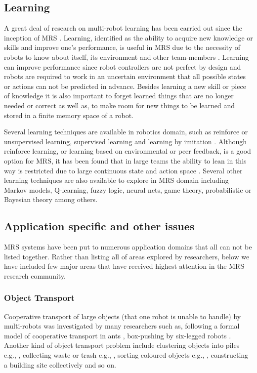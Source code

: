 \subsection{Learning}
A great deal of research on multi-robot learning has been carried out since the inception of MRS \cite{Mataric+2001,Yang+2004,Parker1995}. Learning, identified as the ability to acquire new knowledge or skills and improve one's performance, is useful in MRS due to the necessity of robots to know about itself, its environment and other team-members \cite{Mataric2007}. Learning can improve performance since robot controllers are not perfect by design and robots are required to work in an uncertain environment that all possible states or actions can not be predicted in advance. Besides learning a new skill or piece of knowledge it is also important to forget learned things that are no longer needed or correct as well as, to make room for new things to be learned and stored in a finite memory space of a robot. 

Several learning techniques are available in robotics domain, such as reinforce or unsupervised learning, supervised learning and learning by imitation \cite{Mataric2007}. Although reinforce learning, or learning based on environmental or peer feedback,  is a good option for MRS,  it has been found that  in large teams the ability to lean in this way is restricted due to large continuous state and action space \cite{Yang+2004}. Several other learning techniques are also available to explore in MRS domain including Markov models, Q-learning, fuzzy logic, neural nets, game theory, probabilistic or Bayesian theory among others. 

\subsection{Application specific and other issues}
MRS systems have been put to numerous application domains that all can not be listed together. Rather than listing all of areas explored by researchers, below we have included few major areas that have received highest attention in the MRS research community.

\subsubsection*{Object Transport}
Cooperative transport of large objects (that one robot is unable to handle) by multi-robots was investigated by many researchers such as, following a formal model of cooperative transport in ants \cite{Kube+1993}, box-pushing by six-legged robots \cite{Mataric+1995}. Another kind of object transport problem include clustering objects into piles e.g., \cite{Beckers+1994}, collecting waste or trash e.g., \cite{Parker1994}, sorting coloured objects e.g., \cite{Melhuish+1998}, constructing a building site collectively \cite{Wawerla+2002} and so on. 

